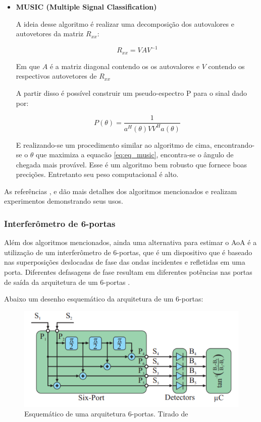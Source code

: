 \begin{itemize}
    \item \textbf{MUSIC (Multiple Signal Classification)}
    
    A ideia desse algoritmo é realizar uma decomposição dos autovalores e autovetores da matriz \( R_{xx} \):

    \begin{equation} \label{eq:eq_autovalores_rxx}
        R_{xx} = VAV^{-1}
    \end{equation}

    Em que \( A \) é a matriz diagonal contendo os os autovalores e \( V \) contendo os respectivos autovetores de \( R_{xx} \)

    A partir disso é possível construir um pseudo-espectro P para o sinal dado por:

    \begin{equation} \label{eq:eq_music}
        P(\theta) = \frac{1}{a^{H}(\theta)VV^{H}a(\theta)}
    \end{equation}

    E realizando-se um procedimento similar ao algoritmo de cima, encontrando-se o \( \theta \) que maximiza a equacão \ref{eq:eq_music}, encontra-se o ângulo de chegada mais provável. Esse é um algoritmo bem robusto que fornece boas precições. Entretanto seu peso computacional é alto.


\end{itemize}

As referências \cite{art19}, \cite{techreport1} e \cite{art20} dão mais detalhes dos algoritmos mencionados e realizam experimentos demonstrando seus usos.


\subsubsection{Interferômetro de 6-portas}
Além dos algoritmos mencionados, ainda uma alternativa para estimar o AoA é a utilização de um interferômetro de 6-portas, que é um dispositivo que é baseado nas superposições deslocadas de fase das ondas incidentes e refletidas em uma porta. Diferentes defasagens de fase resultam em diferentes potências nas portas de saída da arquitetura de um 6-portas \cite{art14}.

Abaixo um desenho esquemático da arquitetura de um 6-portas:

\begin{figure}[H]
	\centering
	\includegraphics[scale = 1]{images/six_port_schematic.png}
	\caption{Esquemático de uma arquitetura 6-portas. Tirado de \cite{art15} }
	\label{fig:six_port_schematic}
\end{figure}


